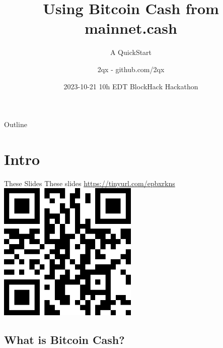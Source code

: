 \documentclass{beamer}
\title[BlockHack Toronto '23] %
{Using Bitcoin Cash from mainnet.cash}
\subtitle
{A QuickStart} %
\author[] %
{2qx - github.com/2qx}
\date[BlockHack TO] %
{2023-10-21 10h EDT 
BlockHack Hackathon}
\begin{document}
\begin{frame}
  \titlepage
\end{frame}

\begin{frame}{Outline}
  \tableofcontents
\end{frame}




\section{Intro}




\begin{frame}{These Slides}
These slides \href{https://tinyurl.com/epbxrkns}{https://tinyurl.com/epbxrkns}
\includegraphics[width=0.5\textwidth, angle=0]{epbxrkns-400.png}
 
\end{frame}

\subsection[Bitcoin Cash (BCH)]{What is Bitcoin Cash?}
\end{document}
